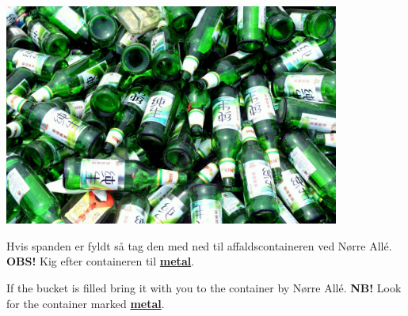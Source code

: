 \documentclass{article}
\begin{document}
\maketitle

\null

\begin{minipage}[l]{.5\textwidth}
  \includegraphics[width=11cm]{../billeder/glas.jpg}
\end{minipage}
\begin{minipage}[c]{.5\textwidth}

\Large Hvis spanden er fyldt så tag den med ned til affaldscontaineren ved Nørre
Allé.\\
\textbf{OBS!} Kig efter containeren til \underline{\textbf{metal}}.

\english
{}

\Large If the bucket is filled bring it with you to the container by Nørre Allé.
\textbf{NB!} Look for the container marked \underline{\textbf{metal}}.
\end{minipage}

\dansk
\underskriv
\end{document}

